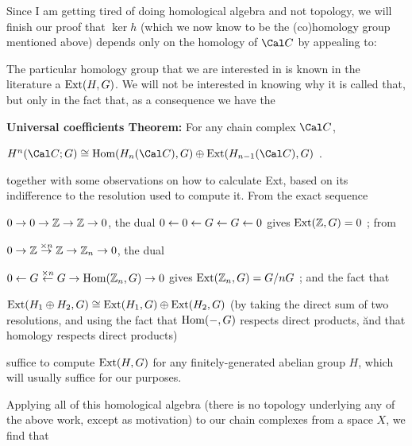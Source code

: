 \vfill
\eject

Since I am getting tired of doing homological algebra and not
topology, we will finish our proof that $\ker h$ (which we now know to be
the (co)homology group mentioned above) depends only on the homology of ${\Cal C}$ by
appealing to:

\msk


\msk

The particular homology group that we are interested in is known in the literature
a $\text{Ext}(H,G)$. We will not be interested in knowing why it is called that, but only 
in the fact that, as a consequence we have the

\ssk

{\bf Universal coefficients Theorem:} For any chain complex ${\Cal C}$,

$H^n({\Cal C};G) \cong \Hom(H_n({\Cal C}),G)\oplus \Ext(H_{n-1}({\Cal C}),G)$ .

\ssk

together with some observations on how to calculate Ext, based on its indifference to
the resolution used to compute it. From the exact sequence

\ssk

$0\rightarrow 0 \rightarrow {\Bbb Z} \rightarrow {\Bbb Z} \rightarrow 0$, the dual $0\leftarrow 0 \leftarrow G \leftarrow G \leftarrow 0$
gives $\text{Ext}({\Bbb Z},G) = 0$ ; from 

\ssk

$0\ra \bbz \buildrel{\times n}\over\ra \bbz \ra \bbz_n\ra 0$, the dual 
 
\ssk

$0\larr G \buildrel{\times n}\over\larr G \ra \Hom(\bbz_n,G)\ra 0$ gives
$\text{Ext}({\Bbb Z}_n,G) = G/nG$ ; and the fact that

\ssk

$\text{Ext}(H_1\oplus H_2,G) \cong \text{Ext}(H_1,G)\oplus \text{Ext}(H_2,G)$ (by taking the direct sum
of two resolutions, and using the fact that $\text{Hom}(-,G)$ respects direct products, \u{and}
that homology respects direct products)

\ssk

suffice to compute $\text{Ext}(H,G)$ for any finitely-generated abelian group $H$, which will
usually suffice for our purposes.

\msk

Applying all of this homological algebra (there is no topology underlying any of the
above work, except as motivation) to our chain complexes from a space $X$, we find
that 

